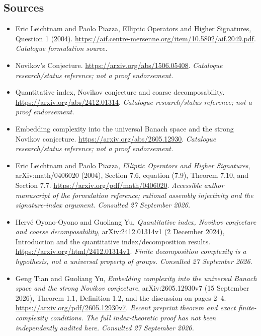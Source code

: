 \documentclass[11pt,a4paper]{article}
\numberwithin{equation}{section}
\begin{document}
\subsection{Sources}
\begin{itemize}\raggedright
\item[\textnormal{[S1]}]\hypertarget{source:30001499:1}{} Eric Leichtnam and Paolo Piazza, Elliptic Operators and Higher Signatures, Question 1 (2004).
\url{https://aif.centre-mersenne.org/item/10.5802/aif.2049.pdf}.
{\small\textit{Catalogue formulation source.}}
\item[\textnormal{[S2]}]\hypertarget{source:30001499:2}{} Novikov's Conjecture.
\url{https://arxiv.org/abs/1506.05408}.
{\small\textit{Catalogue research/status reference; not a proof endorsement.}}
\item[\textnormal{[S3]}]\hypertarget{source:30001499:3}{} Quantitative index, Novikov conjecture and coarse decomposability.
\url{https://arxiv.org/abs/2412.01314}.
{\small\textit{Catalogue research/status reference; not a proof endorsement.}}
\item[\textnormal{[S4]}]\hypertarget{source:30001499:4}{} Embedding complexity into the universal Banach space and the strong Novikov conjecture.
\url{https://arxiv.org/abs/2605.12930}.
{\small\textit{Catalogue research/status reference; not a proof endorsement.}}

\item[\textnormal{[E1]}]\hypertarget{extra:30001499:1}{} Eric Leichtnam and Paolo Piazza, \emph{Elliptic Operators and Higher Signatures}, arXiv:math/0406020 (2004), Section 7.6, equation (7.9), Theorem 7.10, and Section 7.7.
\url{https://arxiv.org/pdf/math/0406020}.
{\small\textit{Accessible author manuscript of the formulation reference; rational assembly injectivity and the signature-index argument. Consulted 27 September 2026.}}
\item[\textnormal{[E2]}]\hypertarget{extra:30001499:2}{} Herv\'e Oyono-Oyono and Guoliang Yu, \emph{Quantitative index, Novikov conjecture and coarse decomposability}, arXiv:2412.01314v1 (2 December 2024), Introduction and the quantitative index/decomposition results.
\url{https://arxiv.org/html/2412.01314v1}.
{\small\textit{Finite decomposition complexity is a hypothesis, not a universal property of groups. Consulted 27 September 2026.}}
\item[\textnormal{[E3]}]\hypertarget{extra:30001499:3}{} Geng Tian and Guoliang Yu, \emph{Embedding complexity into the universal Banach space and the strong Novikov conjecture}, arXiv:2605.12930v7 (15 September 2026), Theorem 1.1, Definition 1.2, and the discussion on pages 2--4.
\url{https://arxiv.org/pdf/2605.12930v7}.
{\small\textit{Recent preprint theorem and exact finite-complexity conditions. The full index-theoretic proof has not been independently audited here. Consulted 27 September 2026.}}
\end{itemize}
\end{document}
